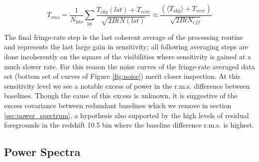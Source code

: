 \documentclass[preprint2]{aastex}
\begin{document}

\begin{equation}
T_{rms}  =\frac{1}{N_{\textrm{lsts}}}\sum_{\textrm{lst}} \frac{T_{sky}(lst) + T_{rcvr}}{\sqrt{2BtN(lst)}} \approx \frac{(\langle T_{sky}\rangle + T_{rcvr})}{\sqrt{2BtN_{eff}}}
\label{eq:Trms}
\end{equation}




The final fringe-rate step is the last coherent average of the processing routine and represents the last large gain in sensitivity; all following averaging steps are done incoherently on the square of the visibilities where sensitivity is gained at a much slower rate. For this reason the noise curves of the fringe-rate averaged data set (bottom set of curves of Figure \ref{fig:noise})  merit closer inspection.  At this sensitivity level we see a notable excess of power in the r.m.s. difference between baselines. Though the cause of this excess is unknown, it is suggestive of the excess covariance between redundant baselines which we remove in section \ref{sec:power_spectrum}, a hypothesis also supported by the high levels of residual foregrounds in the redshift 10.5 bin where the baseline difference r.m.s. is highest.




\subsection{Power Spectra}
\label{sec:pspecs}
\end{document}
